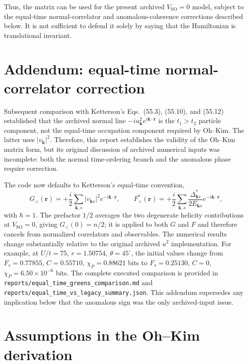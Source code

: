 \documentclass[11pt]{article}
\newcommand{\SO}{\mathrm{SO}}
\begin{document}
Thus, the matrix can be used for the present archived $V_{\SO}=0$ model, subject to the equal-time normal-correlator and anomalous-coherence corrections described below. It is not sufficient to defend it solely by saying that the Hamiltonian is translational invariant.

\section*{Addendum: equal-time normal-correlator correction}
Subsequent comparison with Ketterson's Eqs.~(55.3), (55.10), and (55.12) established that the archived normal line $-iu_{\mathbf k}^2e^{i\mathbf k\cdot\mathbf r}$ is the $t_1>t_2$ particle component, not the equal-time occupation component required by Oh--Kim. The latter uses $|v_{\mathbf k}|^2$. Therefore, this report establishes the validity of the Oh--Kim matrix form, but its original discussion of archived numerical inputs was incomplete: both the normal time-ordering branch and the anomalous phase require correction.

The code now defaults to Ketterson's equal-time convention,
\begin{equation}
G_<(\mathbf r)=+\frac{i}{2}\sum_{\mathbf k,s}|v_{\mathbf ks}|^2e^{-i\mathbf k\cdot\mathbf r},\qquad
F^*_<(\mathbf r)=+\frac{i}{2}\sum_{\mathbf k,s}\frac{\Delta_{\mathbf ks}^*}{2E_{\mathbf ks}}e^{-i\mathbf k\cdot\mathbf r},
\end{equation}
with $\hbar=1$. The prefactor $1/2$ averages the two degenerate helicity contributions at $V_{\SO}=0$, giving $G_<(0)=n/2$; it is applied to both $G$ and $F$ and therefore cancels from normalized correlators and observables. The numerical results change substantially relative to the original archived $u^2$ implementation. For example, at $U/t=75$, $r=1.50754$, $\theta=45^\circ$, the initial values change from $F_s=0.77855$, $C=0.55710$, $\chi_P=0.88621$ bits to $F_s=0.25130$, $C=0$, $\chi_P=6.50\times10^{-6}$ bits. The complete executed comparison is provided in \texttt{reports/equal\_time\_greens\_comparison.md} and \texttt{reports/equal\_time\_vs\_legacy\_summary.json}. This addendum supersedes any implication below that the anomalous sign was the only archived-input issue.

\section{Assumptions in the Oh--Kim derivation}
\end{document}
